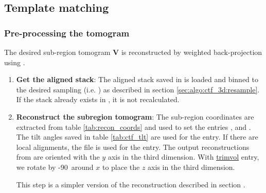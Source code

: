 \subsection{Template matching} \label{sec:algo:picking}

\subsubsection{Pre-processing the tomogram}


The desired sub-region tomogram $\bm{V}$ is reconstructed by weighted back-projection using {\tilt}.
 \begin{enumerate}
    \item \textbf{Get the aligned stack}: The aligned stack saved in  is loaded and binned to the desired sampling (i.e. ) as described in section \ref{sec:algo:ctf_3d:resample}. If the stack already exists in , it is not recalculated.
    
    \item \textbf{Reconstruct the subregion tomogram}: The sub-region coordinates are extracted from table \ref{tab:recon_coords} and used to set the {\tilt} entries ,  and . The tilt angles saved in table \ref{tab:ctf_tlt} are used for the  entry. If there are local alignments, the  file is used for the  entry. The output reconstructions from {\tilt} are oriented with the $y$ axis in the third dimension. With \href{https://bio3d.colorado.edu/imod/doc/man/trimvol.html}{trimvol}  entry, we rotate by -90\textdegree\ around $x$ to place the $z$ axis in the third dimension.
    \begin{note}This step is a simpler version of the reconstruction described in section .\end{note}
\end{enumerate}

